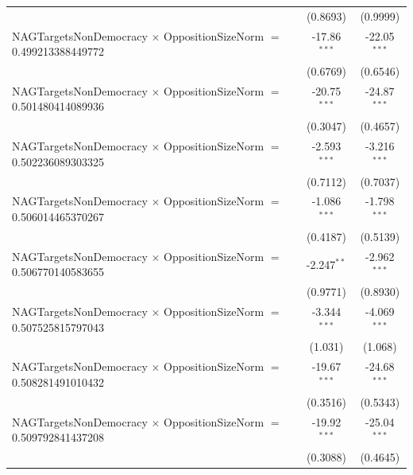 \begin{tabular}{lcc}
                                                                                & (0.8693)             & (0.9999)\\   
   NAGTargetsNonDemocracy $\times$ OppositionSizeNorm $=$ 0.499213388449772     & -17.86$^{***}$       & -22.05$^{***}$\\   
                                                                                & (0.6769)             & (0.6546)\\   
   NAGTargetsNonDemocracy $\times$ OppositionSizeNorm $=$ 0.501480414089936     & -20.75$^{***}$       & -24.87$^{***}$\\   
                                                                                & (0.3047)             & (0.4657)\\   
   NAGTargetsNonDemocracy $\times$ OppositionSizeNorm $=$ 0.502236089303325     & -2.593$^{***}$       & -3.216$^{***}$\\   
                                                                                & (0.7112)             & (0.7037)\\   
   NAGTargetsNonDemocracy $\times$ OppositionSizeNorm $=$ 0.506014465370267     & -1.086$^{***}$       & -1.798$^{***}$\\   
                                                                                & (0.4187)             & (0.5139)\\   
   NAGTargetsNonDemocracy $\times$ OppositionSizeNorm $=$ 0.506770140583655     & -2.247$^{**}$        & -2.962$^{***}$\\   
                                                                                & (0.9771)             & (0.8930)\\   
   NAGTargetsNonDemocracy $\times$ OppositionSizeNorm $=$ 0.507525815797043     & -3.344$^{***}$       & -4.069$^{***}$\\   
                                                                                & (1.031)              & (1.068)\\   
   NAGTargetsNonDemocracy $\times$ OppositionSizeNorm $=$ 0.508281491010432     & -19.67$^{***}$       & -24.68$^{***}$\\   
                                                                                & (0.3516)             & (0.5343)\\   
   NAGTargetsNonDemocracy $\times$ OppositionSizeNorm $=$ 0.509792841437208     & -19.92$^{***}$       & -25.04$^{***}$\\   
                                                                                & (0.3088)             & (0.4645)\\   

\end{tabular}

